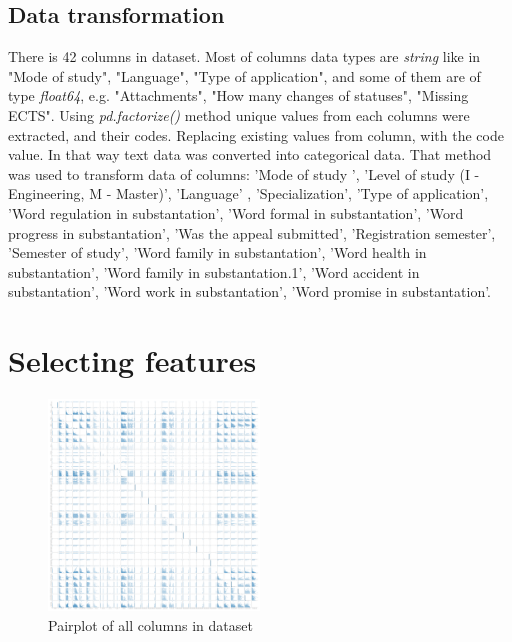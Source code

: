 \documentclass[conference]{IEEEtran}
\begin{document}
\subsection{Data transformation}
There is 42 columns in dataset. Most of columns data types are \textit{string} like in "Mode of study", "Language", "Type of application", and some of them are of type \textit{float64}, e.g. "Attachments", "How many changes of statuses", "Missing ECTS".
Using \textit{pd.factorize()} method unique values from each columns were extracted, and their codes. Replacing existing values from column, with the code value. In that way text data was converted into categorical data. That method was used to transform data of columns: 'Mode of study ', 'Level of study (I - Engineering, M - Master)', 'Language' , 'Specialization', 'Type of application', 'Word regulation in substantation', 'Word formal in substantation', 'Word progress in substantation', 'Was the appeal submitted', 'Registration semester', 'Semester of study', 'Word family in substantation', 'Word health in substantation', 'Word family in substantation.1', 'Word accident in substantation', 'Word work in substantation', 'Word promise  in substantation'.

\section{Selecting features}

\begin{figure}
\includegraphics[width=0.5\textwidth]{img/pairplot.png}
\caption{Pairplot of all columns in dataset}
\label{fig}
\end{figure}
\end{document}
